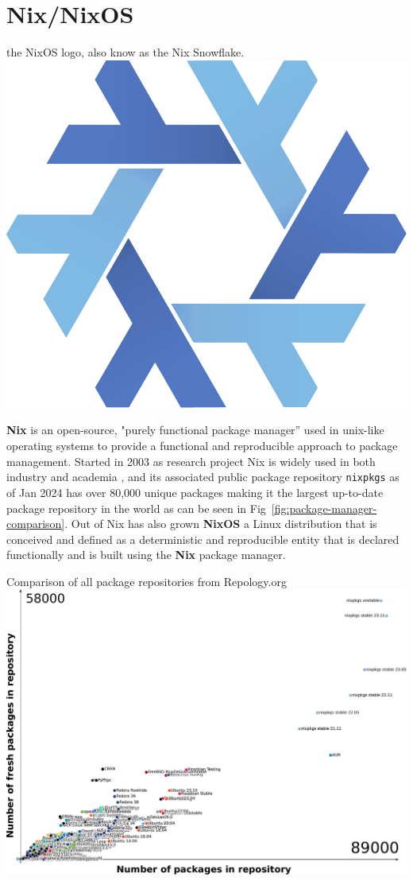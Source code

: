 \section{Nix/NixOS}

\begin{figureBox}[label={fig:nix-snowflake}]{the NixOS logo, also know as the Nix Snowflake.}
  \includegraphics[width=0.2\linewidth]{./figures/background/nix/nix-snowflake.pdf}
\end{figureBox}

\textbf{Nix} \cite{dolstra2004nix} is an open-source, "purely functional package manager” used in unix-like operating systems to provide a functional and reproducible approach to package management. Started in 2003 as research project Nix \cite{dolstra2006purely} is widely used in both industry \cite{NixCommunityNixOSWiki} and academia \cite{10.1145/3152493.3152556} \cite{https://doi.org/10.1002/qua.26872} \cite{LHCbNix}, and its associated public package repository \texttt{nixpkgs} \cite{NixPkgs} as of Jan 2024 has over 80,000 unique packages making it the largest up-to-date package repository in the world as can be seen in Fig~\ref{fig:package-manager-comparison}. Out of Nix has also grown \textbf{NixOS} \cite{10.1145/1411204.1411255} \label{nix-snowflake} a Linux distribution that is conceived and defined as a deterministic and reproducible entity that is declared functionally and is built using the \textbf{Nix} package manager. \\

\begin{figureBox}[label = {fig:package-manager-comparison}]{Comparison of all package repositories from Repology.org \cite{Marakasov_2024}}
\fontsize{5}{6}\selectfont
\includegraphics[width=\linewidth]{./figures/background/nix/pkg-compare.pdf}
\end{figureBox}

